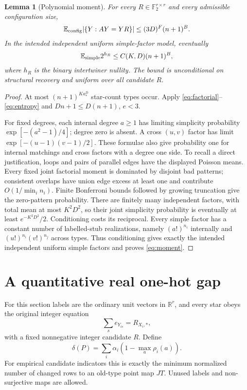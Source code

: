 \documentclass[11pt]{article}
\newtheorem{lemma}{Lemma}
\newcommand{\F}{\mathbb F_2}
\newcommand{\E}{\mathbb E}
\begin{document}
\begin{lemma}[Polynomial moment]\label{lem:moment}
For every $R\in\F^{r\times r}$ and every admissible configuration size,
\[
 \E_{\rm config}|\{Y:AY=YR\}|
 \le(3D)^F(n+1)^B.
\]
In the intended independent uniform simple-factor model, eventually
\begin{equation}\label{eq:moment}
 \E_{\rm simple}2^{h_R}\le C(K,D)(n+1)^B,
\end{equation}
where $h_R$ is the binary intertwiner nullity. The bound is unconditional
on structural recovery and uniform over all candidate $R$.
\end{lemma}
\begin{proof}
At most $(n+1)^{Ka_*^D}$ star-count types occur. Apply
\eqref{eq:factorial}--\eqref{eq:entropy} and
$Dn+1\le D(n+1)$, $e<3$.

For fixed degrees, each internal degree $a\ge1$ has limiting simplicity
probability $\exp[-(a^2-1)/4]$; degree zero is absent. A cross $(u,v)$
factor has limit $\exp[-(u-1)(v-1)/2]$. These formulae also give
probability one for internal matchings and cross factors with a degree
one side. To recall a direct justification, loops and pairs of parallel
edges have the displayed Poisson means. Every fixed joint factorial
moment is dominated by disjoint bad patterns; consistent overlaps have
union edge excess at least one and contribute $O(1/\min_i n_i)$.
Finite Bonferroni bounds followed by growing truncation give the
zero-pattern probability. There are finitely many independent factors,
with total mean at most $K^2D^2$, so their joint simplicity probability
is eventually at least $e^{-K^2D^2}/2$.
Conditioning costs its reciprocal. Every simple factor has a constant
number of labelled-stub realizations, namely $(a!)^{n_i}$ internally
and $(u!)^{n_i}(v!)^{n_j}$ across types. Thus conditioning gives exactly
the intended independent uniform simple factors and proves
\eqref{eq:moment}.
\end{proof}

\section{A quantitative real one-hot gap}
For this section labels are the ordinary unit vectors in $\mathbb R^r$,
and every star obeys the original integer equation
\[
 \sum_s e_{Y_{is}}=R_{X_i,*},
\]
with a fixed nonnegative integer candidate $R$. Define
\[
 \delta(P)=\sum_i\alpha_i(1-\max_a\rho_i(a)).
\]
For empirical candidate indicators this is exactly the minimum normalized
number of changed rows to an old-type point map $JT$. Unused labels and
non-surjective maps are allowed.
\end{document}
